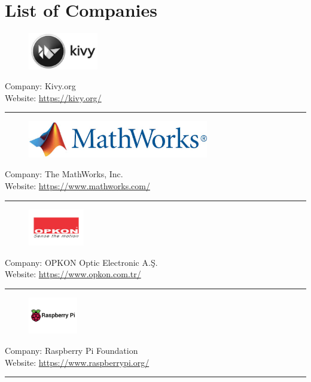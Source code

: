 \chapter{List of Companies}
\label{AppendixListOfCompanies}


\begin{figure}[h!]
\includegraphics[height=1.6cm]{Pictures/KivyLogo.jpg}
\end{figure}
\vspace{3mm}
Company: Kivy.org\\
Website: \url{https://kivy.org/}
\vspace{5mm}
\hrule
\vspace{10mm}

\begin{figure}[h!]
\includegraphics[height=1.6cm]{Pictures/AppMathworksLogo}
\end{figure}
\vspace{3mm}
Company: The MathWorks, Inc.\\
Website: \url{https://www.mathworks.com/}
\vspace{5mm}
\hrule
\vspace{10mm}

\begin{figure}[h!]
\includegraphics[height=1.6cm]{Pictures/OpkonLogo.jpg}
\end{figure}
\vspace{3mm}
Company: OPKON Optic Electronic A.Ş.\\
Website: \url{https://www.opkon.com.tr/}
\vspace{5mm}
\hrule
\vspace{10mm}

\begin{figure}[h!]
\includegraphics[height=1.6cm]{Pictures/Raspberry_Pi_Logo.jpg}
\end{figure}
\vspace{3mm}
Company:  Raspberry Pi Foundation\\
Website: \url{https://www.raspberrypi.org/}
\vspace{5mm}
\hrule
\vspace{10mm}

